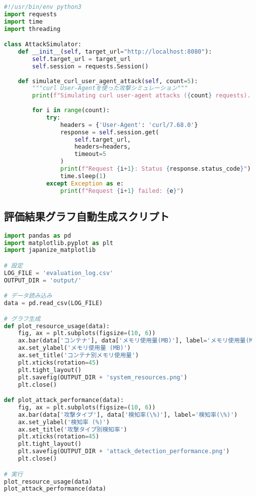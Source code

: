 \documentclass[12pt,a4paper]{article}
\begin{document}
\begin{lstlisting}[language=python, caption=attack\_simulator.py（抜粋）]
#!/usr/bin/env python3
import requests
import time
import threading

class AttackSimulator:
    def __init__(self, target_url="http://localhost:8080"):
        self.target_url = target_url
        self.session = requests.Session()
        
    def simulate_curl_user_agent_attack(self, count=5):
        """curl User-Agentを使った攻撃シミュレーション"""
        print(f"Simulating curl user-agent attacks ({count} requests)...")
        
        for i in range(count):
            try:
                headers = {'User-Agent': 'curl/7.68.0'}
                response = self.session.get(
                    self.target_url, 
                    headers=headers, 
                    timeout=5
                )
                print(f"Request {i+1}: Status {response.status_code}")
                time.sleep(1)
            except Exception as e:
                print(f"Request {i+1} failed: {e}")
\end{lstlisting}

\subsection{評価結果グラフ自動生成スクリプト}

\begin{lstlisting}[language=python, caption=generate\_evaluation\_graphs.py（抜粋）]
import pandas as pd
import matplotlib.pyplot as plt
import japanize_matplotlib

# 設定
LOG_FILE = 'evaluation_log.csv'
OUTPUT_DIR = 'output/'

# データ読み込み
data = pd.read_csv(LOG_FILE)

# グラフ生成
def plot_resource_usage(data):
    fig, ax = plt.subplots(figsize=(10, 6))
    ax.bar(data['コンテナ'], data['メモリ使用量(MB)'], label='メモリ使用量(MB)')
    ax.set_ylabel('メモリ使用量 (MB)')
    ax.set_title('コンテナ別メモリ使用量')
    plt.xticks(rotation=45)
    plt.tight_layout()
    plt.savefig(OUTPUT_DIR + 'system_resources.png')
    plt.close()

def plot_attack_performance(data):
    fig, ax = plt.subplots(figsize=(10, 6))
    ax.bar(data['攻撃タイプ'], data['検知率(\%)'], label='検知率(\%)')
    ax.set_ylabel('検知率 (%)')
    ax.set_title('攻撃タイプ別検知率')
    plt.xticks(rotation=45)
    plt.tight_layout()
    plt.savefig(OUTPUT_DIR + 'attack_detection_performance.png')
    plt.close()

# 実行
plot_resource_usage(data)
plot_attack_performance(data)
\end{lstlisting}
\end{document}
